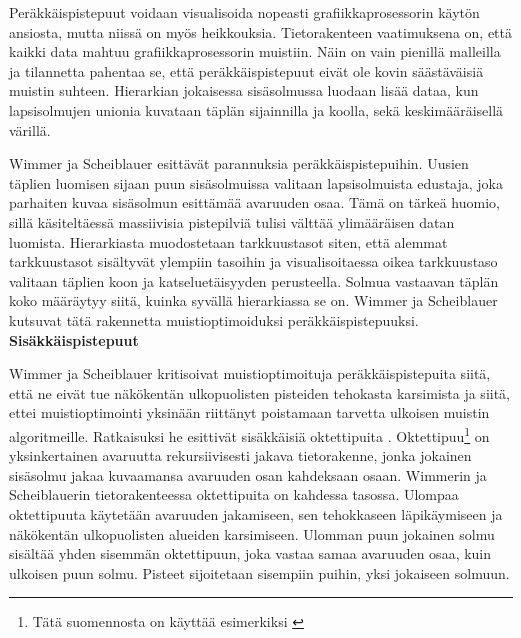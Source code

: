 Peräkkäispistepuut voidaan visualisoida nopeasti grafiikkaprosessorin käytön ansiosta, mutta niissä on myös heikkouksia. Tietorakenteen vaatimuksena on, että kaikki data mahtuu grafiikkaprosessorin muistiin. Näin on vain pienillä malleilla ja tilannetta pahentaa se, että peräkkäispistepuut eivät ole kovin säästäväisiä muistin suhteen. Hierarkian jokaisessa sisäsolmussa luodaan lisää dataa, kun lapsisolmujen unionia kuvataan täplän sijainnilla ja koolla, sekä keskimääräisellä värillä.

Wimmer ja Scheiblauer esittävät parannuksia peräkkäispistepuihin. Uusien täplien luomisen sijaan puun sisäsolmuissa valitaan lapsisolmuista edustaja, joka parhaiten kuvaa sisäsolmun esittämää avaruuden osaa. Tämä on tärkeä huomio, sillä käsiteltäessä massiivisia pistepilviä tulisi välttää ylimääräisen datan luomista. Hierarkiasta muodostetaan tarkkuustasot siten, että alemmat tarkkuustasot sisältyvät ylempiin tasoihin ja visualisoitaessa oikea tarkkuustaso valitaan täplien koon ja katseluetäisyyden perusteella. Solmua vastaavan täplän koko määräytyy siitä, kuinka syvällä hierarkiassa se on. Wimmer ja Scheiblauer kutsuvat tätä rakennetta muistioptimoiduksi peräkkäispistepuuksi.  \cite{ip} %
\\



\noindent\large\textbf{Sisäkkäispistepuut}
\normalsize

\noindent Wimmer ja Scheiblauer kritisoivat muistioptimoituja peräkkäispistepuita siitä, että ne eivät tue näkökentän ulkopuolisten pisteiden tehokasta karsimista ja siitä, ettei muistioptimointi yksinään riittänyt poistamaan tarvetta ulkoisen muistin algoritmeille. Ratkaisuksi he esittivät sisäkkäisiä oktettipuita . Oktettipuu\footnote{Tätä suomennosta on käyttää esimerkiksi \cite{oktettipuu}} on yksinkertainen avaruutta rekursiivisesti jakava tietorakenne, jonka jokainen sisäsolmu jakaa kuvaamansa avaruuden osan kahdeksaan osaan. Wimmerin ja Scheiblauerin tietorakenteessa oktettipuita on kahdessa tasossa. Ulompaa oktettipuuta käytetään avaruuden jakamiseen, sen tehokkaseen läpikäymiseen ja näkökentän ulkopuolisten alueiden karsimiseen. Ulomman puun jokainen solmu sisältää yhden sisemmän oktettipuun, joka vastaa samaa avaruuden osaa, kuin ulkoisen puun solmu. Pisteet sijoitetaan sisempiin puihin, yksi jokaiseen solmuun. \cite{ip}

